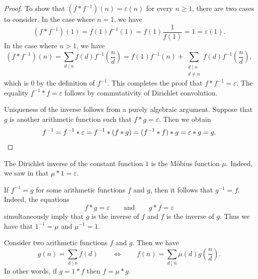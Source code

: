 \begin{proof}
  To show that $(f\ast f^{-1})(n)=\varepsilon(n)$ for every $n\geq 1$, there are two cases to consider. In the case where $n=1$, we have
  \begin{equation*}
    (f\ast f^{-1})(1) = f(1)f^{-1}(1) = f(1)\frac{1}{f(1)} = 1 = \varepsilon(1).
  \end{equation*}
  In the case where $n>1$,  we have
  \begin{equation*}
    (f\ast f^{-1})(n) = \sum_{d\mid n}f(d)f^{-1}\left(\frac{n}{d}\right)= f(1)f^{-1}(n)+ \sum_{\substack{d\mid n \\ d\neq n}}f(d)f^{-1}\left(\frac{n}{d}\right),
  \end{equation*}
  which is $0$ by the definition of $f^{-1}$. This completes the proof that $f\ast f^{-1}=\varepsilon$. The equality $f^{-1}\ast f=\varepsilon$ follows by commutativity of Dirichlet convolution.

  Uniqueness of the inverse follows from a purely algebraic argument. Suppose that $g$ is another arithmetic function such that $f\ast g=\varepsilon$. Then we obtain
  \begin{equation*}
    f^{-1} = f^{-1} \ast \varepsilon = f^{-1}\ast (f\ast g) = (f^{-1}\ast f)\ast g = \varepsilon \ast g = g.\qedhere
  \end{equation*}
\end{proof}

\begin{example}
  The Dirichlet inverse of the constant function $1$ is the M\"obius function $\mu$. Indeed, we saw in  that $\mu\ast 1=\varepsilon$.
\end{example}

\begin{remark}
  If $f^{-1}=g$ for some arithmetic functions $f$ and $g$, then it follows that $g^{-1}=f$. Indeed, the equations
  \begin{equation*}
    f\ast g=\varepsilon\qquad\text{and}\qquad g\ast f=\varepsilon
  \end{equation*}
  simultaneously imply that $g$ is the inverse of $f$ and $f$ is the inverse of $g$. Thus we have that $1^{-1}=\mu$ and $\mu^{-1}=1$.
\end{remark}

\begin{theorem}
  Consider two arithmetic functions $f$ and $g$. Then we have
  \begin{equation*}
    g(n)=\sum_{d\mid n}f(d)\qquad\Leftrightarrow\qquad f(n)=\sum_{d\mid n}\mu(d)g\left(\frac{n}{d}\right).
  \end{equation*}
  In other words, if $g=1\ast f$ then $f=\mu\ast g$.
\end{theorem}

